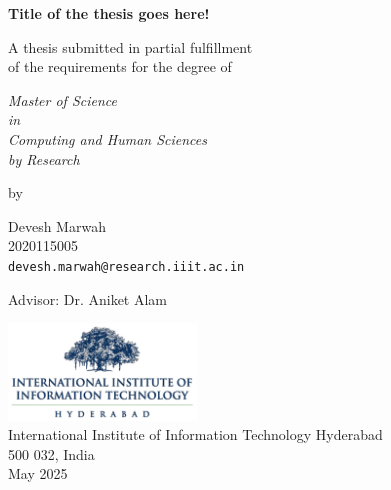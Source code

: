 \thispagestyle{empty}
\begin{center}
\vspace*{1.5cm}
{\Large \bf Title of the thesis goes here!}

\vspace*{2.2cm}
{\large A thesis submitted in partial fulfillment\\}
{\large  of the requirements for the degree of \\}

\vspace*{1cm}
{\it {\large Master of Science } \\
{\large in\\}
{\large Computing and Human Sciences \\}
{\large by Research \\}}


\vspace*{0.8cm}
{\large by}

\vspace*{6mm}
{\large Devesh Marwah\\}
{\large 2020115005\\
{\small \tt devesh.marwah@research.iiit.ac.in}}

\vspace*{5mm}
{\large Advisor: Dr. Aniket Alam\\}


\vspace*{3.0cm}
{\includegraphics[width=5cm]{figures/iiit.png}\\}
{\large International Institute of Information Technology Hyderabad\\}
{\large 500 032, India\\}
\vspace*{5mm}
{\large May 2025\\}
\end{center}